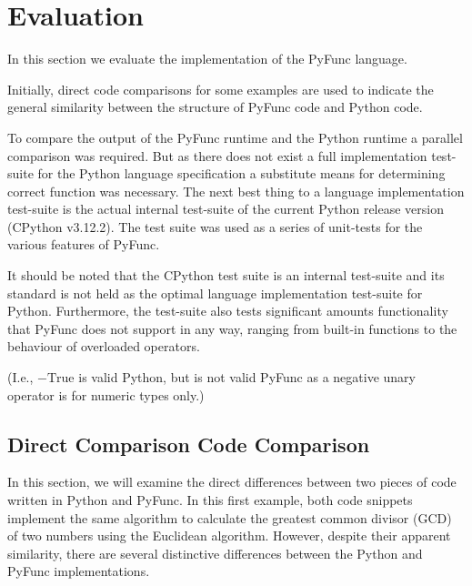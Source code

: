 \documentclass{l4proj}
\begin{document}
\chapter{Evaluation} 

In this section we evaluate the implementation of the PyFunc language.

Initially, direct code comparisons for some examples are used to indicate the general similarity between the structure of PyFunc code and Python code.

To compare the output of the PyFunc runtime and the Python runtime a parallel comparison was required.
But as there does not exist a full implementation test-suite for the Python language specification a substitute means for determining correct function was necessary.
The next best thing to a language implementation test-suite is the actual internal test-suite of the current Python release version (CPython v3.12.2).
The test suite was used as a series of unit-tests for the various features of PyFunc.

It should be noted that the CPython test suite is an internal test-suite and its standard is not held as the optimal language implementation test-suite for Python.
Furthermore, the test-suite also tests significant amounts functionality that PyFunc does not support in any way, ranging from built-in functions to the behaviour of overloaded operators.

(I.e., $-\text{True}$ is valid Python, but is not valid PyFunc as a negative unary operator is for numeric types only.)

\section{Direct Comparison Code Comparison}


In this section, we will examine the direct differences between two pieces of code written in Python and PyFunc.
In this first example, both code snippets implement the same algorithm to calculate the greatest common divisor (GCD) of two numbers using the Euclidean algorithm.
However, despite their apparent similarity, there are several distinctive differences between the Python and PyFunc implementations.
\end{document}
